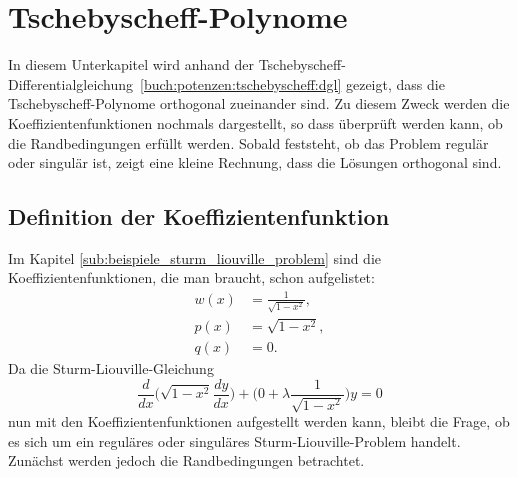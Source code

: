 %
%
%

\section{Tschebyscheff-Polynome
\label{sturmliouville:sub:tschebyscheff-polynome}}
In diesem Unterkapitel wird anhand der
Tschebyscheff-Differentialgleichung~\eqref{buch:potenzen:tschebyscheff:dgl}
gezeigt, dass die Tschebyscheff-Polynome orthogonal zueinander sind.
Zu diesem Zweck werden die Koeffizientenfunktionen nochmals dargestellt, so dass
überprüft werden kann, ob die Randbedingungen erfüllt werden.
Sobald feststeht, ob das Problem regulär oder singulär ist, zeigt eine
kleine Rechnung, dass die Lösungen orthogonal sind.

\subsection*{Definition der Koeffizientenfunktion}
Im Kapitel \ref{sub:beispiele_sturm_liouville_problem} sind die
Koeffizientenfunktionen, die man braucht, schon aufgelistet:
\begin{align*}
	w(x) &= \frac{1}{\sqrt{1-x^2}}, \\
	p(x) &= \sqrt{1-x^2}, \\
	q(x) &= 0.
\end{align*}
Da die Sturm-Liouville-Gleichung
\begin{equation}
	\label{eq:sturm-liouville-equation-tscheby}
	\frac{d}{dx} \biggl (\sqrt{1-x^2} \frac{dy}{dx}\biggr ) +
	\biggl (0 + \lambda \frac{1}{\sqrt{1-x^2}}\biggr ) y
	=
	0 
\end{equation}
nun mit den Koeffizientenfunktionen aufgestellt werden kann, bleibt die Frage,
ob es sich um ein reguläres oder singuläres Sturm-Liouville-Problem handelt.
Zunächst werden jedoch die Randbedingungen betrachtet.

